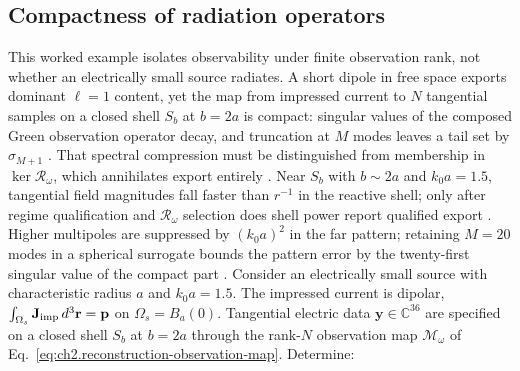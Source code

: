 \subsection{Compactness of radiation operators}
\label{sec:ch2101}
This worked example isolates observability under finite observation rank, not whether an
electrically small source radiates. A short dipole in free space exports dominant $\ell=1$ content,
yet the map from impressed current to $N$ tangential samples on a closed shell $S_b$ at $b=2a$
is compact: singular values of the composed Green observation operator decay, and truncation at
$M$ modes leaves a tail set by $\sigma_{M+1}$ \cite{hansen1988,harrington2001}. That spectral
compression must be distinguished from membership in $\ker\mathcal{R}_\omega$, which annihilates
export entirely \cite{devaney2004,stratton1941}. Near $S_b$ with $b\sim 2a$ and $k_0 a=1.5$,
tangential field magnitudes fall faster than $r^{-1}$ in the reactive shell; only after regime
qualification and $\mathcal{R}_\omega$ selection does shell power report qualified export
\cite{chu1948,stratton1941}. Higher multipoles are suppressed by $(k_0 a)^2$ in the far pattern;
retaining $M=20$ modes in a spherical surrogate bounds the pattern error by the twenty-first
singular value of the compact part \cite{hansen1988}.
Consider an electrically small source with characteristic radius $a$ and $k_0 a=1.5$. The impressed
current is dipolar, $\int_{\Omega_s}\mathbf{J}_{\mathrm{imp}}\,d^{3}\mathbf{r}=\mathbf{p}$ on
$\Omega_s=B_a(0)$. Tangential electric data $\mathbf{y}\in\mathbb{C}^{36}$ are specified on a
closed shell $S_b$ at $b=2a$ through the rank-$N$ observation map
$\mathcal{M}_\omega$ of Eq.~\eqref{eq:ch2.reconstruction-observation-map}. Determine:
